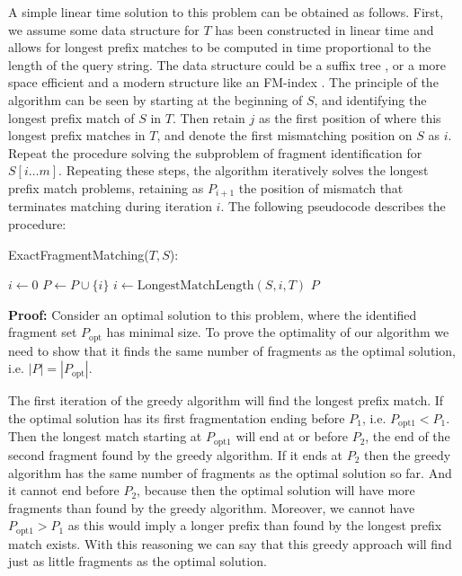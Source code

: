 A simple linear time solution to this problem can be obtained as
follows. First, we assume some data structure for $T$ has been
constructed in linear time and allows for longest prefix matches to be
computed in time proportional to the length of the query string. The
data structure could be a suffix tree \citep{mccreight1976space}, or a
more space efficient and a modern structure like an FM-index
\citep{ferragina2000opportunistic}. The principle of the algorithm can be
seen by starting at the beginning of $S$, and identifying the longest
prefix match of $S$ in $T$. Then retain $j$ as the first position of
where this longest prefix matches in $T$, and denote the first
mismatching position on $S$ as $i$. Repeat the procedure solving the
subproblem of fragment identification for $S[i\dots m]$. Repeating these
steps, the algorithm iteratively solves the longest prefix match
problems, retaining as $P_{i+1}$ the position of mismatch that
terminates matching during iteration $i$. The following pseudocode
describes the procedure:

\begin{algorithm}[H]
\caption{ExactFragmentMatching($T, S$):}
\begin{algorithmic}[1]
  \STATE $i \leftarrow 0$
    \STATE $P \leftarrow P\cup \{i\}$
    \STATE $i \leftarrow \text{LongestMatchLength}(S,i,T)$
  \ENDWHILE
  \RETURN $P$
\end{algorithmic}
\end{algorithm}

\textbf{Proof:} Consider an optimal solution to this problem, where the
identified fragment set $P_{\mathrm{opt}}$ has minimal size. To prove
the optimality of our algorithm we need to show that it finds the same
number of fragments as the optimal solution, i.e. $|P| =
|P_{\mathrm{opt}}|$.

The first iteration of the greedy algorithm will find the longest prefix
match. If the optimal solution has its first fragmentation ending before
$P_1$, i.e. $P_{\mathrm{opt1}} < P_1$. Then the longest match starting at
$P_{\mathrm{opt1}}$ will end at or before $P_2$, the end of the second
fragment found by the greedy algorithm. If it ends at $P_2$ then the
greedy algorithm has the same number of fragments as the optimal
solution so far. And it cannot end before $P_2$, because then the
optimal solution will have more fragments than found by the greedy
algorithm. Moreover, we cannot have $P_{\mathrm{opt1}} > P_1$ as this
would imply a longer prefix than found by the longest prefix match
exists. With this reasoning we can say that this greedy approach will
find just as little fragments as the optimal solution.

